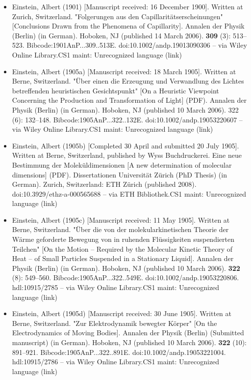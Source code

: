 \begin{itemize}
\item Einstein, Albert (1901) [Manuscript received: 16 December 1900]. Written at Zurich, Switzerland. "Folgerungen aus den Capillaritätserscheinungen" [Conclusions Drawn from the Phenomena of Capillarity]. Annalen der Physik (Berlin) (in German). Hoboken, NJ (published 14 March 2006). \textbf{309} (3): 513–523. Bibcode:1901AnP...309..513E. doi:10.1002/andp.19013090306 – via Wiley Online Library.CS1 maint: Unrecognized language (link)
\item Einstein, Albert (1905a) [Manuscript received: 18 March 1905]. Written at Berne, Switzerland. "Über einen die Erzeugung und Verwandlung des Lichtes betreffenden heuristischen Gesichtspunkt" [On a Heuristic Viewpoint Concerning the Production and Transformation of Light] (PDF). Annalen der Physik (Berlin) (in German). Hoboken, NJ (published 10 March 2006). 322 (6): 132–148. Bibcode:1905AnP...322..132E. doi:10.1002/andp.19053220607 – via Wiley Online Library.CS1 maint: Unrecognized language (link)
\item Einstein, Albert (1905b) [Completed 30 April and submitted 20 July 1905]. Written at Berne, Switzerland, published by Wyss Buchdruckerei. Eine neue Bestimmung der Moleküldimensionen [A new determination of molecular dimensions] (PDF). Dissertationen Universität Zürich (PhD Thesis) (in German). Zurich, Switzerland: ETH Zürich (published 2008). doi:10.3929/ethz-a-000565688 – via ETH Bibliothek.CS1 maint: Unrecognized language (link)
\item Einstein, Albert (1905c) [Manuscript received: 11 May 1905]. Written at Berne, Switzerland. "Über die von der molekularkinetischen Theorie der Wärme geforderte Bewegung von in ruhenden Flüssigkeiten suspendierten Teilchen" [On the Motion – Required by the Molecular Kinetic Theory of Heat – of Small Particles Suspended in a Stationary Liquid]. Annalen der Physik (Berlin) (in German). Hoboken, NJ (published 10 March 2006). \textbf{322} (8): 549–560. Bibcode:1905AnP...322..549E. doi:10.1002/andp.19053220806. hdl:10915/2785 – via Wiley Online Library.CS1 maint: Unrecognized language (link)
\item Einstein, Albert (1905d) [Manuscript received: 30 June 1905]. Written at Berne, Switzerland. "Zur Elektrodynamik bewegter Körper" [On the Electrodynamics of Moving Bodies]. Annalen der Physik (Berlin) (Submitted manuscript) (in German). Hoboken, NJ (published 10 March 2006). \textbf{322} (10): 891–921. Bibcode:1905AnP...322..891E. doi:10.1002/andp.19053221004. hdl:10915/2786 – via Wiley Online Library.CS1 maint: Unrecognized language (link)

\end{itemize}
